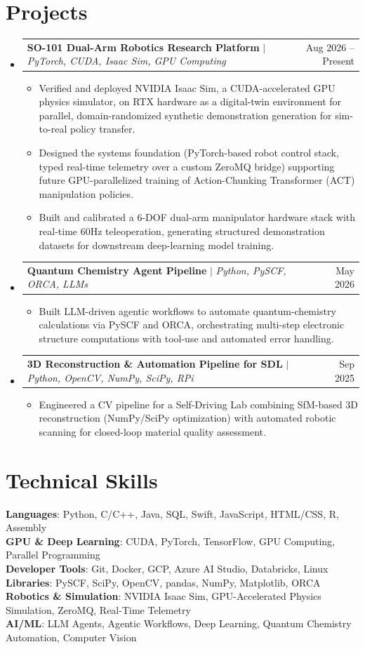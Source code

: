 \documentclass[letterpaper,11pt]{article}
\makeatletter
\newcommand{\resumeItem}[1]{
  \item\small{
    {#1 \vspace{-2.2pt}}
  }
}
\newcommand{\resumeProjectHeading}[2]{
    \item
    \begin{tabular*}{0.97\textwidth}{l@{\extracolsep{\fill}}r}
      \small#1 & #2 \\
    \end{tabular*}\vspace{-7pt}
}
\newcommand{\resumeSubHeadingListStart}{\begin{itemize}[leftmargin=0.15in, label={}]}
\newcommand{\resumeSubHeadingListEnd}{\end{itemize}}
\newcommand{\resumeItemListStart}{\begin{itemize}}
\newcommand{\resumeItemListEnd}{\end{itemize}\vspace{-5pt}}
\makeatother
\begin{document}
\section{Projects}
    \resumeSubHeadingListStart
      \resumeProjectHeading
        {\textbf{SO-101 Dual-Arm Robotics Research Platform} $|$ \emph{PyTorch, CUDA, Isaac Sim, GPU Computing}}{Aug 2026 -- Present}
        \resumeItemListStart
          \resumeItem{Verified and deployed NVIDIA Isaac Sim, a CUDA-accelerated GPU physics simulator, on RTX hardware as a digital-twin environment for parallel, domain-randomized synthetic demonstration generation for sim-to-real policy transfer.}
          \resumeItem{Designed the systems foundation (PyTorch-based robot control stack, typed real-time telemetry over a custom ZeroMQ bridge) supporting future GPU-parallelized training of Action-Chunking Transformer (ACT) manipulation policies.}
          \resumeItem{Built and calibrated a 6-DOF dual-arm manipulator hardware stack with real-time 60Hz teleoperation, generating structured demonstration datasets for downstream deep-learning model training.}
        \resumeItemListEnd
      \resumeProjectHeading
        {\textbf{Quantum Chemistry Agent Pipeline} $|$ \emph{Python, PySCF, ORCA, LLMs}}{May 2026}
        \resumeItemListStart
          \resumeItem{Built LLM-driven agentic workflows to automate quantum-chemistry calculations via PySCF and ORCA, orchestrating multi-step electronic structure computations with tool-use and automated error handling.}
        \resumeItemListEnd
      \resumeProjectHeading
        {\textbf{3D Reconstruction \& Automation Pipeline for SDL} $|$ \emph{Python, OpenCV, NumPy, SciPy, RPi}}{Sep 2025}
        \resumeItemListStart
          \resumeItem{Engineered a CV pipeline for a Self-Driving Lab combining SfM-based 3D reconstruction (NumPy/SciPy optimization) with automated robotic scanning for closed-loop material quality assessment.}
        \resumeItemListEnd
    \resumeSubHeadingListEnd

\section{Technical Skills}
 \begin{itemize}[leftmargin=0.15in, label={}]
    \small{\item{
     \textbf{Languages}{: Python, C/C++, Java, SQL, Swift, JavaScript, HTML/CSS, R, Assembly} \\
     \textbf{GPU \& Deep Learning}{: CUDA, PyTorch, TensorFlow, GPU Computing, Parallel Programming} \\
     \textbf{Developer Tools}{: Git, Docker, GCP, Azure AI Studio, Databricks, Linux} \\
     \textbf{Libraries}{: PySCF, SciPy, OpenCV, pandas, NumPy, Matplotlib, ORCA} \\
     \textbf{Robotics \& Simulation}{: NVIDIA Isaac Sim, GPU-Accelerated Physics Simulation, ZeroMQ, Real-Time Telemetry} \\
     \textbf{AI/ML}{: LLM Agents, Agentic Workflows, Deep Learning, Quantum Chemistry Automation, Computer Vision}
    }}
 \end{itemize}
\end{document}
